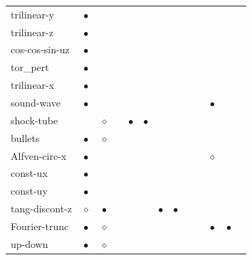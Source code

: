\documentclass[\mydriver,12pt,twoside,notitlepage,a4paper]{article}
\newcommand{\req}{$\bullet$}
\newcommand{\opt}{$\diamond$}
\begin{document}
\begin{tabular}{@{}l|c|c|c|c|c|c|c|c|c|c|c|c}
                    & {}   & {}   & {}   & {}   & {}   \\
\midrule
   trilinear-y      & \req & {}   & {}   & {}   & {}   & {}   & {}   
                    & {}   & {}   & {}   & {}   & {}   \\
\midrule
   trilinear-z      & \req & {}   & {}   & {}   & {}   & {}   & {}   
                    & {}   & {}   & {}   & {}   & {}   \\
\midrule
   cos-cos-sin-uz   & \req & {}   & {}   & {}   & {}   & {}   & {}   
                    & {}   & {}   & {}   & {}   & {}   \\
\midrule
   tor_pert         & \req & {}   & {}   & {}   & {}   & {}   & {}   
                    & {}   & {}   & {}   & {}   & {}   \\
\midrule
   trilinear-x      & \req & {}   & {}   & {}   & {}   & {}   & {}   
                    & {}   & {}   & {}   & {}   & {}   \\
\midrule
   sound-wave       & \req & {}   & {}   & {}   & {}   & {}   & {}   
                    & {}   & {}   & \req & {}   & {}   \\
\midrule
   shock-tube       & {}   & \opt & {}   & \req & \req & {}   & {}   
                    & {}   & {}   & {}   & {}   & {}   \\
\midrule
   bullets          & \req & \opt & {}   & {}   & {}   & {}   & {}   
                    & {}   & {}   & {}   & {}   & {}   \\
\midrule
   Alfven-circ-x    & \req & {}   & {}   & {}   & {}   & {}   & {}   
                    & {}   & {}   & \opt & {}   & {}   \\
\midrule
   const-ux         & \req & {}   & {}   & {}   & {}   & {}   & {}   
                    & {}   & {}   & {}   & {}   & {}   \\
\midrule
   const-uy         & \req & {}   & {}   & {}   & {}   & {}   & {}   
                    & {}   & {}   & {}   & {}   & {}   \\
\midrule
   tang-discont-z   & \opt & \req & {}   & {}   & {}   & \req & \req 
                    & {}   & {}   & {}   & {}   & {}   \\
\midrule
   Fourier-trunc    & \req & \opt & {}   & {}   & {}   & {}   & {}   
                    & {}   & {}   & \req & \req & {}   \\
\midrule
   up-down          & \req & \opt & {}   & {}   & {}   & {}   & {}   
                    & {}   & {}   & {}   & {}   & {}   \\
%
\bottomrule
\end{tabular}
\end{document}
